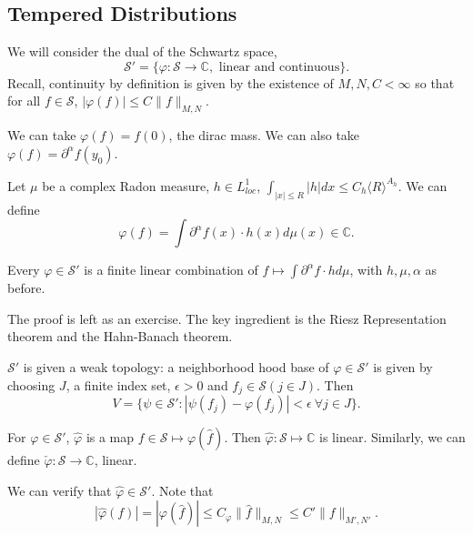 \documentclass[11pt]{scrartcl}
\newcommand{\C}{\mathbb C}
\let \phi \varphi
\let \hat \widehat
\newcommand{\<}{\langle}
\renewcommand{\>}{\rangle}
\begin{document}
\subsection{Tempered Distributions}
We will consider the dual of the Schwartz space,
$$\mathscr S' = \{\phi: \mathscr S \rightarrow \C, \text{ linear and continuous}\}.$$
Recall, continuity by definition is given by the existence of $M, N, C < \infty$ so that for all $f \in \mathscr S$, $|\phi(f)| \le C \|f\|_{M, N}.$
\begin{example} We can take $\phi(f) = f(0)$, the dirac mass.  We can also take $\phi(f) = \partial^{\alpha} f(y_0)$.  

Let $\mu$ be a complex Radon measure, $h \in L_{loc}^1$, $\int_{|x| \le R}|h|dx \le C_h\<R\>^{A_h}.$  We can define
$$\phi(f) = \int \partial^\alpha f(x) \cdot h(x) d\mu(x) \in \C.$$
\end{example}
\begin{thm} Every $\phi \in \mathscr S'$ is a finite linear combination of $f \mapsto \int \partial^\alpha f \cdot h d\mu$, with $h, \mu, \alpha$ as before.
\end{thm}
The proof is left as an exercise.  The key ingredient is the Riesz Representation theorem and the Hahn-Banach theorem.

$\mathscr S'$ is given a weak topology: a neighborhood hood base of $\phi \in \mathscr S'$ is given by choosing $J$, a finite index set, $\epsilon > 0$ and $f_j \in \mathscr S (j \in J)$.  Then
$$V = \{\psi \in \mathscr S' : |\psi(f_j) - \phi(f_j)| < \epsilon\ \forall j \in J\}. $$

\begin{definition} For $\phi \in \mathscr S'$, $\hat{\phi}$ is a map $f \in \mathscr S \mapsto \phi(\hat{f})$.  Then $\hat{\phi}:\mathscr S \mapsto \C$ is linear.  Similarly, we can define $\check{\phi}: \mathscr S \rightarrow \C$, linear.  
\end{definition}
We can verify that $\hat{\phi} \in \mathscr S'$.  Note that 
$$|\hat{\phi}(f)| = |\phi(\hat{f})| \le C_{\phi} \|\hat{f}\|_{M, N} \le C' \|f\|_{M', N'}.$$
\end{document}
